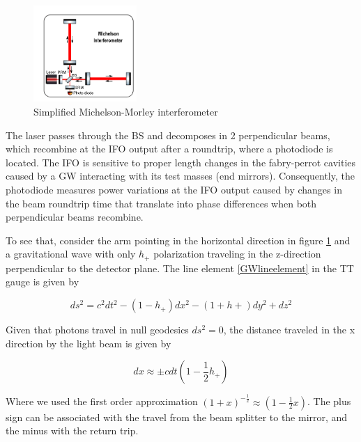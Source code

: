 \begin{figure}[hbt!]
\begin{center}
\includegraphics[width=0.35\textwidth, angle=0]{images/IFO.png}
\captionsetup{width=0.8\textwidth}
\caption{Simplified Michelson-Morley interferometer}
\label{IFO}
\end{center}
\end{figure}

\FloatBarrier

The laser passes through the BS and decomposes in 2 perpendicular beams, which recombine at the IFO output after a roundtrip, where a photodiode is located. The IFO is sensitive to proper length changes in the fabry-perrot cavities caused by a GW interacting with its test masses (end mirrors). Consequently, the photodiode measures power variations at the IFO output caused by changes in the beam roundtrip time that translate into phase differences when both perpendicular beams recombine.


To see that, consider the arm pointing in the horizontal direction in figure \ref{IFO} and a gravitational wave with only $h_+$  polarization traveling in the z-direction perpendicular to the detector plane. The line element \ref{GWlineelement} in the TT gauge is given by

\begin{equation}
ds^2 = c^2 dt^2 - (1-h_+) dx^2 - (1+h+) dy^2 + dz^2
\end{equation}

Given that photons travel in null geodesics $ds^2 = 0$, the distance traveled in the x direction by the light beam is given by

\begin{equation}\label{dx}
dx \approx \pm cdt \left(  1-\frac{1}{2} h_+ \right)
\end{equation}

Where we used the first order approximation $(1+x)^{-\frac{1}{2}} \approx (1 - \frac{1}{2} x)$. The plus sign can be associated with the travel from the beam splitter to the mirror, and the minus with the return trip. 

